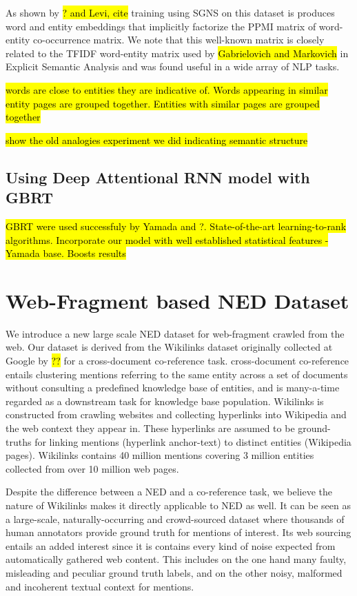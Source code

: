 \documentclass[11pt]{article}
\begin{document}
As shown by \hl{? and Levi, cite} training using SGNS on this dataset is produces word and entity embeddings that implicitly factorize the PPMI matrix of word-entity co-occurrence matrix. We note that this well-known matrix is closely related to the TFIDF word-entity matrix used by \hl{Gabrielovich and Markovich} in Explicit Semantic Analysis and was found useful in a wide array of NLP tasks. 

\hl{words are close to entities they are indicative of. Words appearing in similar entity pages are grouped together. Entities with similar pages are grouped together}

\hl{show the old analogies experiment we did indicating semantic structure}

\subsection{Using Deep Attentional RNN model with GBRT}

\hl{GBRT were used successfuly by Yamada and ?. State-of-the-art learning-to-rank algorithms. Incorporate our model with well established statistical features - Yamada base. Boosts results }

\section{Web-Fragment based NED Dataset}
We introduce a new large scale NED dataset for web-fragment crawled from the web. Our dataset is derived from the Wikilinks dataset originally collected at Google by \hl{??}  for a cross-document co-reference task. cross-document co-reference entails clustering mentions referring to the same entity across a set of documents without consulting a predefined knowledge base of entities, and is many-a-time regarded as a downstream task for knowledge base population. Wikilinks is constructed from crawling websites and collecting hyperlinks into Wikipedia and the web context they appear in. These hyperlinks are assumed to be ground-truths for linking mentions (hyperlink anchor-text) to distinct entities (Wikipedia pages). Wikilinks contains 40 million mentions covering 3 million entities collected from over 10 million web pages.

Despite the difference between a NED and a co-reference task, we believe the nature of Wikilinks makes it directly applicable to NED as well. It can be seen as a large-scale, naturally-occurring and crowd-sourced dataset where thousands of human annotators provide ground truth for mentions of interest. Its web sourcing entails an added interest since it is contains every kind of noise expected from automatically gathered web content. This includes on the one hand many faulty, misleading and peculiar ground truth labels, and on the other noisy, malformed and incoherent textual context for mentions. 
\end{document}
